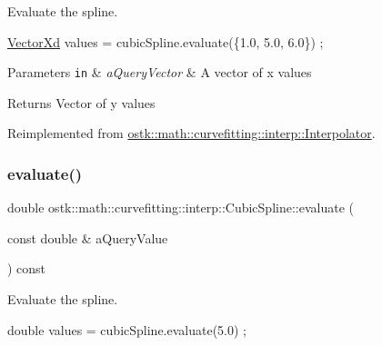 Evaluate the spline. 


\begin{DoxyCode}
\hyperlink{namespaceostk_1_1math_1_1obj_a84bdc62967e939556fb94869024693ff}{VectorXd} values = cubicSpline.evaluate(\{1.0, 5.0, 6.0\}) ;
\end{DoxyCode}



\begin{DoxyParams}[1]{Parameters}
\mbox{\tt in}  & {\em a\+Query\+Vector} & A vector of x values \\
\hline
\end{DoxyParams}
\begin{DoxyReturn}{Returns}
Vector of y values 
\end{DoxyReturn}


Reimplemented from \hyperlink{classostk_1_1math_1_1curvefitting_1_1interp_1_1_interpolator_aac2035e403234027b227479d1e1b544e}{ostk\+::math\+::curvefitting\+::interp\+::\+Interpolator}.

\mbox{\label{classostk_1_1math_1_1curvefitting_1_1interp_1_1_cubic_spline_a9cd7d809db55125256a73582cb040e4f}} 
\subsubsection{\texorpdfstring{evaluate()}{evaluate()}\hspace{0.1cm}{\footnotesize\ttfamily [2/2]}}
{\footnotesize\ttfamily double ostk\+::math\+::curvefitting\+::interp\+::\+Cubic\+Spline\+::evaluate (\begin{DoxyParamCaption}\item[{const double \&}]{a\+Query\+Value }\end{DoxyParamCaption}) const\hspace{0.3cm}{\ttfamily [virtual]}}



Evaluate the spline. 


\begin{DoxyCode}
\textcolor{keywordtype}{double} values = cubicSpline.evaluate(5.0) ;
\end{DoxyCode}



